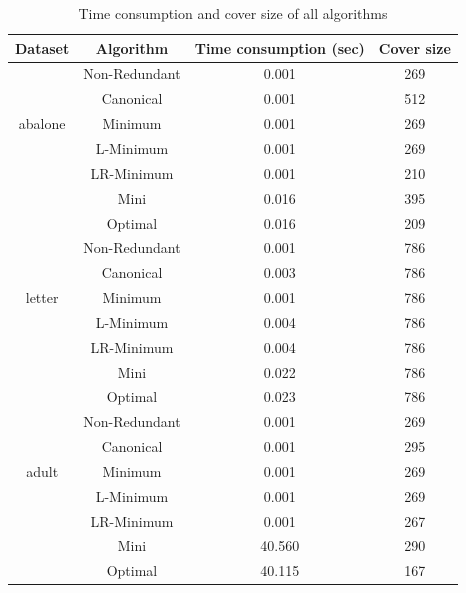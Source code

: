 \documentclass[11pt]{book}
\begin{document}
\begin{table}[H]

	\centering
	
\begin{tabular}{|c|c|c|c|}

    \hline
    Dataset & Algorithm & Time consumption (sec) & Cover size \\
    
    \hline
    \multirow{5}{*}{abalone}
    	& Non-Redundant & 0.001 & 269 \\
    	& Canonical     & 0.001 & 512 \\
    	& Minimum       & 0.001 & 269 \\
    	& L-Minimum     & 0.001 & 269 \\
    	& LR-Minimum    & 0.001 & 210 \\	
    	& Mini          & 0.016 & 395 \\	
    	& Optimal       & 0.016 & 209 \\

    \hline
    \multirow{5}{*}{letter}
    	& Non-Redundant & 0.001 & 786 \\
    	& Canonical     & 0.003 & 786 \\
    	& Minimum       & 0.001 & 786 \\
    	& L-Minimum     & 0.004 & 786 \\
    	& LR-Minimum    & 0.004 & 786 \\	
    	& Mini          & 0.022 & 786 \\	
    	& Optimal       & 0.023 & 786 \\

    \hline
    \multirow{5}{*}{adult}
    	& Non-Redundant & 0.001  & 269 \\
    	& Canonical     & 0.001  & 295 \\
    	& Minimum       & 0.001  & 269 \\
    	& L-Minimum     & 0.001  & 269 \\
    	& LR-Minimum    & 0.001  & 267 \\	
    	& Mini          & 40.560 & 290 \\	
    	& Optimal       & 40.115 & 167 \\
	
    \hline
    
\end{tabular}

	\caption{Time consumption and cover size of all algorithms}
	
\end{table}
\end{document}
